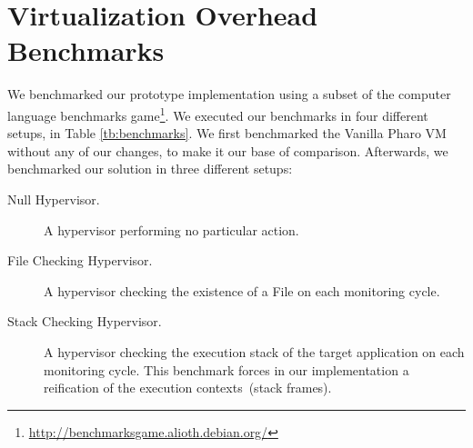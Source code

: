 \section{Virtualization Overhead Benchmarks} \label{sec:virtualization_benchmarks}

We benchmarked our prototype implementation using a subset of the computer language benchmarks game\footnote{\url{http://benchmarksgame.alioth.debian.org/}}. We executed our benchmarks in four different setups, in Table \ref{tb:benchmarks}. We first benchmarked the Vanilla Pharo VM without any of our changes, to make it our base of comparison. Afterwards, we benchmarked our solution in three different setups:

\begin{description}
\item[Null Hypervisor.] A hypervisor performing no particular action.
\item[File Checking Hypervisor.] A hypervisor checking the existence of a File on each monitoring cycle.
\item[Stack Checking Hypervisor.] A hypervisor checking the execution stack of the target application on each monitoring cycle. This benchmark forces in our implementation a reification of the execution contexts~(stack frames).
\end{description}

